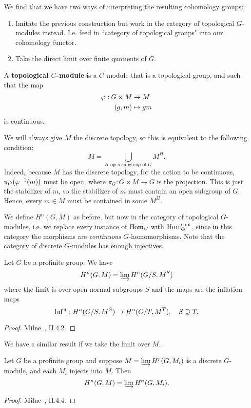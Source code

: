 We find that we have two ways of interpreting the resulting cohomology groups:
\begin{enumerate}
\item
Imitate the previous construction but work in the category of topological $G$-modules instead. I.e. feed in ``category of topological groups" into our cohomology functor.
\item
Take the direct limit over finite quotients of $G$.
\end{enumerate}
\begin{df}
A \textbf{topological $G$-module} is a $G$-module that is a topological group, and such that the map
\begin{align*}
\varphi:G\times M&\to M\\
(g,m)&\mapsto gm
\end{align*}
is continuous.
\end{df}
We will always give $M$ the discrete topology, so this is equivalent to the following condition:
\[
M=\bigcup_{H\text{ open subgroup of }G} M^H.
\]
Indeed, because $M$ has the discrete topology, for the action to be continuous, $\pi_G(\varphi^{-1}(m))$ must be open, where $\pi_G:G\times M\to G$ is the projection. This is just the stabilizer of $m$, so the stabilizer of $m$ must contain an open subgroup of $G$. Hence, every $m\in M$ must be contained in some $M^H$.

We define $H^n(G,M)$ as before, but now in the category of topological $G$-modules, i.e. we replace every instance of $\operatorname{Hom}_G$ with $\operatorname{Hom}_G^{\text{cont}}$, since in this category the morphisms are {\it continuous} $G$-homomorphisms. Note that the category of discrete $G$-modules has enough injectives.
\begin{thm}
Let $G$ be a profinite group. 
We have
\[
H^n(G,M)=\varinjlim H^n(G/S,M^S)%
\]
where the limit is over open normal subgroups $S$ and the maps are the inflation maps
\[
\operatorname{Inf}^n : H^n(G/S,M^S)\to H^n(G/T, M^T),\quad S\supseteq T.
\]
\end{thm}
\begin{proof}
Milne~\cite{Mi08}, II.4.2.
\end{proof}
We have a similar result if we take the limit over $M$.
\begin{pr}
Let $G$ be a profinite group and suppose $M=\varinjlim H^r(G,M_i)$ is a discrete $G$-module, and each $M_i$ injects into $M$. Then
\[
H^n(G,M)=\varinjlim H^n(G,M_i).
\]
\end{pr}
\begin{proof}
Milne~\cite{Mi08}, II.4.4.
\end{proof}
